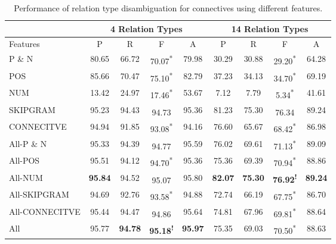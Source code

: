 \begin{table}[ht]
\centering
\begin{tabular}{|l|c|c|c|c|c|c|c|c|}
\hline
              & \multicolumn{4}{c|}{4 Relation Types}                            & \multicolumn{4}{c|}{14 Relation Types}                           \\ \hline
Features      &     P     &     R     &     F                        &     A     &     P     &     R     &     F                        &     A     \\ \hline
P \& N        &     80.65 &     66.72 &     70.07\textsuperscript{*} &     79.98 &     30.29 &     30.88 &     29.20\textsuperscript{*} &     64.28 \\ \hline
POS           &     85.66 &     70.47 &     75.10\textsuperscript{*} &     82.79 &     37.23 &     34.13 &     34.70\textsuperscript{*} &     69.19 \\ \hline
NUM           &     13.42 &     24.97 &     17.46\textsuperscript{*} &     53.67 &      7.12 &      7.79 &      5.34\textsuperscript{*} &     41.61 \\ \hline
SKIPGRAM      &     95.23 &     94.43 &     94.73\textsuperscript{ } &     95.36 &     81.23 &     75.30 &     76.34\textsuperscript{ } &     89.24 \\ \hline
CONNECITVE    &     94.94 &     91.85 &     93.08\textsuperscript{*} &     94.16 &     76.60 &     65.67 &     68.42\textsuperscript{*} &     86.98 \\ \hline
All-P \& N    &     95.33 &     94.39 &     94.77\textsuperscript{ } &     95.59 &     76.02 &     69.61 &     71.13\textsuperscript{*} &     89.09 \\ \hline
All-POS       &     95.51 &     94.12 &     94.70\textsuperscript{*} &     95.36 &     75.36 &     69.39 &     70.94\textsuperscript{*} &     88.86 \\ \hline
All-NUM       & \bf 95.84 &     94.52 &     95.07\textsuperscript{ } &     95.80 & \bf 82.07 & \bf 75.30 & \bf 76.92\textsuperscript{!} & \bf 89.24 \\ \hline
All-SKIPGRAM  &     94.69 &     92.76 &     93.58\textsuperscript{*} &     94.88 &     72.74 &     66.19 &     67.75\textsuperscript{*} &     86.70 \\ \hline
All-CONNECITVE&     95.44 &     94.47 &     94.86\textsuperscript{ } &     95.64 &     74.81 &     67.96 &     69.81\textsuperscript{*} &     88.64 \\ \hline
All           &     95.77 & \bf 94.78 & \bf 95.18\textsuperscript{!} & \bf 95.97 &     75.35 &     69.03 &     70.50\textsuperscript{*} &     88.63 \\ \hline

\end{tabular}
\caption{\label{t:sense-features} Performance of relation type
disambiguation for connectives using different features. }
\end{table}

